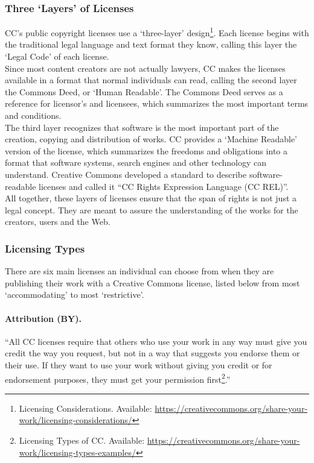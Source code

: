 \documentclass[a4paper]{article}
\begin{document}
\subsubsection{Three `Layers' of Licenses} 
CC's public copyright licenses use a `three-layer' design\footnote{Licensing Considerations. Available: \url{https://creativecommons.org/share-your-work/licensing-considerations/}}. Each license begins with the traditional legal language and text format they know, calling this layer the `Legal Code' of each license.\\

\noindent
Since most content creators are not actually lawyers, CC makes the licenses available in a format that normal individuals can read, calling the second layer the Commons Deed, or `Human Readable'. The Commons Deed serves as a reference for licensor's and licensees, which summarizes the most important terms and conditions.\\

\noindent
The third layer recognizes that software is the most important part of the creation, copying and distribution of works. CC provides a `Machine Readable' version of the license, which summarizes the freedoms and obligations into a format that software systems, search engines and other technology can understand. Creative Commons developed a standard to describe software-readable licenses and called it ``CC Rights Expression Language (CC REL)''.\\

\noindent
All together, these layers of licenses ensure that the span of rights is not just a legal concept. They are meant to assure the understanding of the works for the creators, users and the Web.

\subsubsection{Licensing Types} %
There are six main licenses an individual can choose from when they are publishing their work with a Creative Commons license, listed below from most `accommodating' to most `restrictive'. 

\paragraph{Attribution (BY).}
``All CC licenses require that others who use your work in any way must give you credit the way you request, but not in a way that suggests you endorse them or their use. If they want to use your work without giving you credit or for endorsement purposes, they must get your permission first\footnote{Licensing Types of CC. Available: \url{https://creativecommons.org/share-your-work/licensing-types-examples/}}.''
\end{document}
